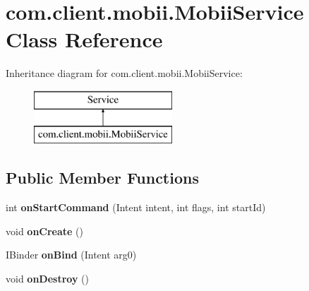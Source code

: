 \hypertarget{classcom_1_1client_1_1mobii_1_1_mobii_service}{\section{com.\-client.\-mobii.\-Mobii\-Service Class Reference}
\label{classcom_1_1client_1_1mobii_1_1_mobii_service}
}
Inheritance diagram for com.\-client.\-mobii.\-Mobii\-Service\-:\begin{figure}[H]
\begin{center}
\leavevmode
\includegraphics[height=2.000000cm]{classcom_1_1client_1_1mobii_1_1_mobii_service}
\end{center}
\end{figure}
\subsection*{Public Member Functions}
\begin{DoxyCompactItemize}
\item 
\hypertarget{classcom_1_1client_1_1mobii_1_1_mobii_service_a081b103aa66b37e8148e396d69e4751c}{int {\bfseries on\-Start\-Command} (Intent intent, int flags, int start\-Id)}\label{classcom_1_1client_1_1mobii_1_1_mobii_service_a081b103aa66b37e8148e396d69e4751c}

\item 
\hypertarget{classcom_1_1client_1_1mobii_1_1_mobii_service_a98211758bc15b3d27fef64a32a1fe18f}{void {\bfseries on\-Create} ()}\label{classcom_1_1client_1_1mobii_1_1_mobii_service_a98211758bc15b3d27fef64a32a1fe18f}

\item 
\hypertarget{classcom_1_1client_1_1mobii_1_1_mobii_service_a84dce42edf25bf015263ec08d2c123da}{I\-Binder {\bfseries on\-Bind} (Intent arg0)}\label{classcom_1_1client_1_1mobii_1_1_mobii_service_a84dce42edf25bf015263ec08d2c123da}

\item 
\hypertarget{classcom_1_1client_1_1mobii_1_1_mobii_service_ab664a7ed211905863f46f53ff6836608}{void {\bfseries on\-Destroy} ()}\label{classcom_1_1client_1_1mobii_1_1_mobii_service_ab664a7ed211905863f46f53ff6836608}

\end{DoxyCompactItemize}
